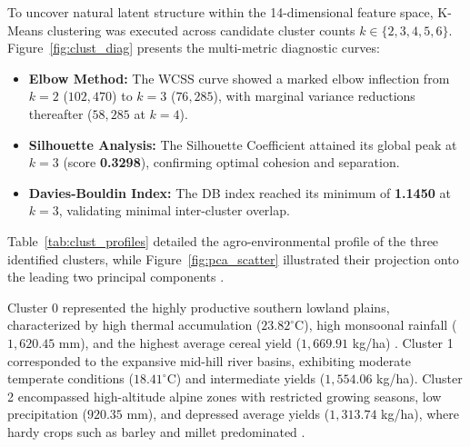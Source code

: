 \documentclass[conference]{IEEEtran}
\begin{document}
To uncover natural latent structure within the 14-dimensional feature space, K-Means clustering \cite{macqueen1967} was executed across candidate cluster counts $k \in \{2, 3, 4, 5, 6\}$. Figure~\ref{fig:clust_diag} presents the multi-metric diagnostic curves:
\begin{itemize}
    \item \textbf{Elbow Method:} The WCSS curve \cite{macqueen1967} showed a marked elbow inflection from $k=2$ ($102,470$) to $k=3$ ($76,285$), with marginal variance reductions thereafter ($58,285$ at $k=4$).
    \item \textbf{Silhouette Analysis:} The Silhouette Coefficient \cite{rousseeuw1987} attained its global peak at $k=3$ (score \textbf{0.3298}), confirming optimal cohesion and separation.
    \item \textbf{Davies-Bouldin Index:} The DB index \cite{davies1979} reached its minimum of \textbf{1.1450} at $k=3$, validating minimal inter-cluster overlap.
\end{itemize}

Table~\ref{tab:clust_profiles} detailed the agro-environmental profile of the three identified clusters, while Figure~\ref{fig:pca_scatter} illustrated their projection onto the leading two principal components \cite{hotelling1933}.

\begin{table}[htbp]
\centering
\caption{Agro-Climatic Cluster Profiles ($k=3$ Regimes)}
\label{tab:clust_profiles}
\renewcommand{\arraystretch}{1.15}
\end{table}

Cluster 0 represented the highly productive southern lowland plains, characterized by high thermal accumulation ($23.82^\circ\text{C}$), high monsoonal rainfall ($1,620.45$ mm), and the highest average cereal yield ($1,669.91$ kg/ha) \cite{fernandez2021}. Cluster 1 corresponded to the expansive mid-hill river basins, exhibiting moderate temperate conditions ($18.41^\circ\text{C}$) and intermediate yields ($1,554.06$ kg/ha). Cluster 2 encompassed high-altitude alpine zones with restricted growing seasons, low precipitation ($920.35$ mm), and depressed average yields ($1,313.74$ kg/ha), where hardy crops such as barley and millet predominated \cite{dhakal2023}.
\end{document}

